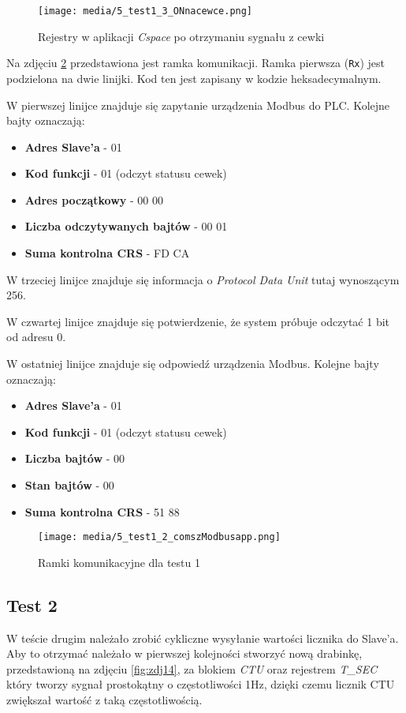 \documentclass{article}
\begin{document}
\begin{figure}[H]
    \centering
    \texttt{[image: media/5\_test1\_3\_ONnacewce.png]}
    \caption{Rejestry w aplikacji \textit{Cspace} po otrzymaniu sygnału z cewki}
    \label{fig:zdj13}
\end{figure}

\newpage

Na zdjęciu \ref{fig:zdj12} przedstawiona jest ramka komunikacji. Ramka pierwsza (\texttt{Rx}) jest podzielona na dwie linijki. Kod ten jest zapisany w kodzie heksadecymalnym. 

W pierwszej linijce znajduje się zapytanie urządzenia Modbus do PLC. Kolejne bajty oznaczają:
\begin{itemize}
    \item \textbf{Adres Slave'a} - 01
    \item \textbf{Kod funkcji} - 01 (odczyt statusu cewek)
    \item \textbf{Adres początkowy} - 00 00
    \item \textbf{Liczba odczytywanych bajtów} - 00 01
    \item \textbf{Suma kontrolna CRS} - FD CA
\end{itemize}

W trzeciej linijce znajduje się informacja o \textit{Protocol Data Unit} tutaj wynoszącym 256.

W czwartej linijce znajduje się potwierdzenie, że system próbuje odczytać 1 bit od adresu 0.

W ostatniej linijce znajduje się odpowiedź urządzenia Modbus. Kolejne bajty oznaczają:
\begin{itemize}
    \item \textbf{Adres Slave'a} - 01
    \item \textbf{Kod funkcji} - 01 (odczyt statusu cewek)
    \item \textbf{Liczba bajtów} - 00
    \item \textbf{Stan bajtów} - 00
    \item \textbf{Suma kontrolna CRS} - 51 88
\end{itemize}


\begin{figure}[H]
    \centering
    \texttt{[image: media/5\_test1\_2\_comszModbusapp.png]}
    \caption{Ramki komunikacyjne dla testu 1}
    \label{fig:zdj12}
\end{figure}


\newpage
\subsection{Test 2}
 W teście drugim należało zrobić cykliczne wysyłanie wartości licznika do Slave'a. Aby to otrzymać należało w pierwszej  kolejności stworzyć nową drabinkę, przedstawioną na zdjęciu \ref{fig:zdj14}, za blokiem \textit{CTU} oraz rejestrem \textit{T\_SEC} który tworzy sygnał prostokątny o częstotliwości 1Hz, dzięki czemu licznik CTU zwiększał wartość z taką częstotliwością.
\end{document}
